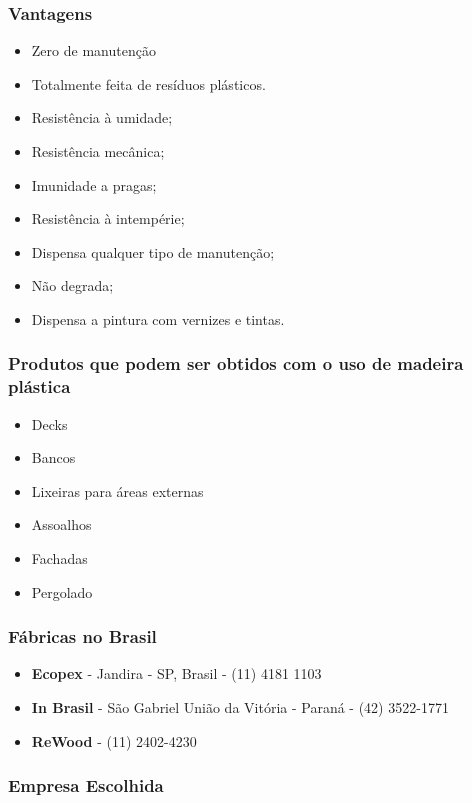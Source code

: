 \subsubsection*{\textbf{Vantagens}}
	
	\begin{itemize}
		\item Zero de manutenção
		\item Totalmente feita de resíduos plásticos.
		\item Resistência à umidade;
		\item Resistência mecânica;
		\item Imunidade a pragas;
		\item Resistência à intempérie;
		\item Dispensa qualquer tipo de manutenção;
		\item Não degrada;
		\item Dispensa a pintura com vernizes e tintas.
	\end{itemize}

\subsubsection*{\textbf{Produtos que podem ser obtidos com o uso de madeira plástica}}
	
	\begin{itemize}
		\item Decks
		\item Bancos 
		\item Lixeiras para áreas externas
		\item Assoalhos
		\item Fachadas
		\item Pergolado
	\end{itemize}

\subsubsection*{\textbf{Fábricas no Brasil}}
	
	\begin{itemize}
		\item \textbf{Ecopex} - Jandira - SP, Brasil - (11) 4181 1103
		\item \textbf{In Brasil} - São Gabriel União da Vitória - Paraná - (42) 3522-1771
		\item \textbf{ReWood} - (11) 2402-4230
	\end{itemize}

\subsubsection*{\textbf{Empresa Escolhida}}

